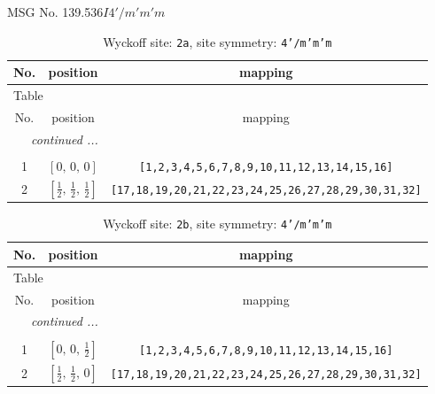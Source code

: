 \documentclass[fleqn,8pt]{jsarticle}
\begin{document}
\setcounter{MaxMatrixCols}{32}

\renewcommand{\tablename}{Table~}
\renewcommand{\figurename}{Figure~}
\begin{center}
\LARGE
MSG No. 139.536\quad$I4'/m'm'm$
\end{center}
\renewcommand{\arraystretch}{1.2}
\begin{longtable}{ccc}
\caption{Wyckoff site: {\tt 2a}, site symmetry: {\tt 4'/m'm'm}}
 \\
 \hline \hline
No. & position & mapping \\ \hline \endfirsthead

\multicolumn{2}{l}{\tablename\ \thetable{}} \\
 \hline \hline
No. & position & mapping \\ \hline \endhead

 \hline \hline
\multicolumn{2}{r}{\footnotesize\it continued ...} \\ \endfoot

 \hline \hline
\multicolumn{2}{r}{} \\ \endlastfoot

1 & $\left[ 0,\, 0,\, 0 \right]$ & {\tt [1,2,3,4,5,6,7,8,9,10,11,12,13,14,15,16]} \\ \hline
2 & $\left[ \frac{1}{2},\, \frac{1}{2},\, \frac{1}{2} \right]$ & {\tt [17,18,19,20,21,22,23,24,25,26,27,28,29,30,31,32]} \\
\end{longtable}
\renewcommand{\arraystretch}{1.2}
\begin{longtable}{ccc}
\caption{Wyckoff site: {\tt 2b}, site symmetry: {\tt 4'/m'm'm}}
 \\
 \hline \hline
No. & position & mapping \\ \hline \endfirsthead

\multicolumn{2}{l}{\tablename\ \thetable{}} \\
 \hline \hline
No. & position & mapping \\ \hline \endhead

 \hline \hline
\multicolumn{2}{r}{\footnotesize\it continued ...} \\ \endfoot

 \hline \hline
\multicolumn{2}{r}{} \\ \endlastfoot

1 & $\left[ 0,\, 0,\, \frac{1}{2} \right]$ & {\tt [1,2,3,4,5,6,7,8,9,10,11,12,13,14,15,16]} \\ \hline
2 & $\left[ \frac{1}{2},\, \frac{1}{2},\, 0 \right]$ & {\tt [17,18,19,20,21,22,23,24,25,26,27,28,29,30,31,32]} \\
\end{longtable}
\end{document}
